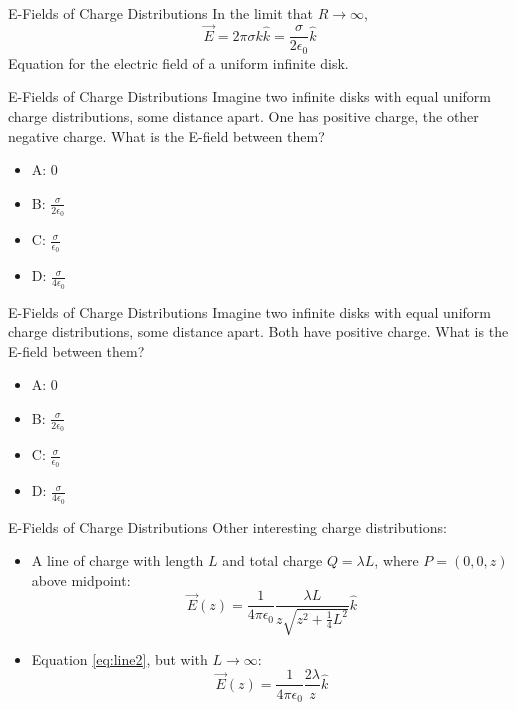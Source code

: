 \documentclass{beamer}
\begin{document}
\begin{frame}{E-Fields of Charge Distributions}
In the limit that $R \rightarrow \infty$,
\begin{equation}
\vec{E} = 2\pi\sigma k \hat{k} = \frac{\sigma}{2\epsilon_0} \hat{k} \label{eq:disk3}
\end{equation}
Equation for the electric field of a uniform infinite disk.
\end{frame}

\begin{frame}{E-Fields of Charge Distributions}
Imagine two infinite disks with equal uniform charge distributions, some distance apart.  One has positive charge, the other negative charge.  What is the E-field between them?
\begin{itemize}
\item A: 0
\item B: $\frac{\sigma}{2\epsilon_0}$
\item C: $\frac{\sigma}{\epsilon_0}$
\item D: $\frac{\sigma}{4\epsilon_0}$
\end{itemize}
\end{frame}

\begin{frame}{E-Fields of Charge Distributions}
Imagine two infinite disks with equal uniform charge distributions, some distance apart.  Both have positive charge.  What is the E-field between them?
\begin{itemize}
\item A: 0
\item B: $\frac{\sigma}{2\epsilon_0}$
\item C: $\frac{\sigma}{\epsilon_0}$
\item D: $\frac{\sigma}{4\epsilon_0}$
\end{itemize}
\end{frame}

\begin{frame}{E-Fields of Charge Distributions}
Other interesting charge distributions:
\begin{itemize}
\item A line of charge with length $L$ and total charge $Q = \lambda L$, where $P = (0,0,z)$ above midpoint:
\begin{equation}
\vec{E}(z) = \frac{1}{4\pi\epsilon_0} \frac{\lambda L}{z\sqrt{z^2 + \frac{1}{4} L^2}} \hat{k} \label{eq:line2}
\end{equation}
\item Equation \ref{eq:line2}, but with $L \rightarrow \infty$:
\begin{equation}
\vec{E}(z) = \frac{1}{4\pi\epsilon_0} \frac{2\lambda}{z} \hat{k}
\end{equation}
\end{itemize}
\end{frame}
\end{document}
